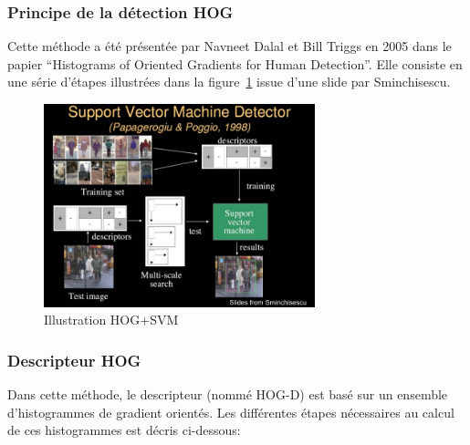 \documentclass[12pt]{article}
\begin{document}
\subsubsection{Principe de la détection HOG}
Cette méthode a été présentée par Navneet Dalal et Bill Triggs en 2005 dans le papier ``Histograms of Oriented Gradients for Human Detection''.
Elle consiste en une série d'étapes illustrées dans la figure~\ref{fig:hog_topo} issue d'une slide par Sminchisescu.
\begin{figure}[!ht]
    \centering
	    \includegraphics[clip=true,trim= 10 0 80 80,width=0.7\textwidth]{img/hog_svm.jpg}
	    \caption{Illustration HOG+SVM}
   	    \label{fig:hog_topo}
\end{figure}

\subsubsection{Descripteur HOG}
Dans cette méthode, le descripteur (nommé HOG-D) est basé sur un ensemble d'histogrammes de gradient orientés. Les différentes étapes nécessaires au calcul de ces histogrammes est décris ci-dessous:
\end{document}
